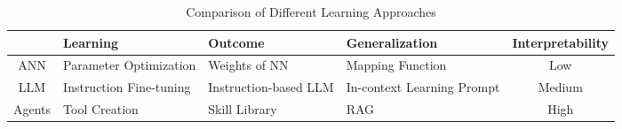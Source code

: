 \begin{table}[h!]
\label{tab:learning_approaches}
\begin{tabularx}{\textwidth}{|c|>{\centering\arraybackslash}m{3cm}|>{\centering\arraybackslash}m{4cm}|>{\centering\arraybackslash}m{4cm}|c|}
\hline
 & \textbf{Learning} & \textbf{Outcome} & \textbf{Generalization} & \textbf{Interpretability} \\ \hline
ANN & Parameter Optimization & Weights of NN & Mapping Function & Low \\ \hline
LLM & Instruction Fine-tuning & Instruction-based LLM & In-context Learning Prompt & Medium \\ \hline
Agents & Tool Creation & Skill Library & RAG & High \\ \hline
\end{tabularx}
\centering
\vspace{2mm} %
\caption{Comparison of Different Learning Approaches}
\end{table}
